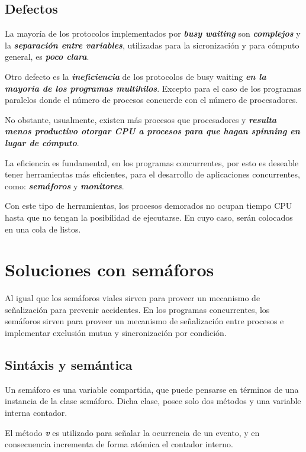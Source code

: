 \documentclass[a4paper, 10pt]{report}
\begin{document}
\section{Defectos}

La mayoría de los protocolos implementados por \textbf{\emph{busy waiting}} son \textbf{\emph{complejos}} y la \textbf{\emph{separación entre variables}}, utilizadas para la sicronización y para cómputo general, es \textbf{\emph{poco clara}}.

Otro defecto es la \textbf{\emph{ineficiencia}} de los protocolos de busy waiting \textbf{\emph{en la mayoria de los programas multihilos}}. Excepto para el caso de los programas paralelos donde el número de procesos concuerde con el número de procesadores. 

No obstante, usualmente, existen más procesos que procesadores y \textbf{\emph{resulta menos productivo otorgar CPU a procesos para que hagan spinning en lugar de cómputo}}.

La eficiencia es fundamental, en los programas concurrentes, por esto es deseable tener herramientas más eficientes, para el desarrollo de aplicaciones concurrentes, como: \textbf{\emph{semáforos}} y \textbf{\emph{monitores}}. 

Con este tipo de herramientas, los procesos demorados no ocupan tiempo CPU hasta que no tengan la posibilidad de ejecutarse. En cuyo caso, serán colocados en una cola de listos.

\chapter{Soluciones con semáforos}
\vspace*{-10mm}

Al igual que los semáforos viales sirven para proveer un mecanismo de señalización para prevenir accidentes. En los programas concurrentes, los semáforos sirven para proveer un mecanismo de señalización entre procesos e implementar exclusión mutua y sincronización por condición.

\section{Sintáxis y semántica}

Un semáforo es una variable compartida, que puede pensarse en términos de una instancia de la clase semáforo. Dicha clase, posee solo dos métodos y una variable interna contador. 

El método \textbf{\emph{v}} es utilizado para señalar la ocurrencia de un evento, y en consecuencia incrementa de forma atómica el contador interno.
\end{document}
